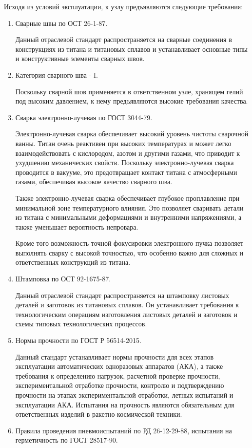 Исходя из условий эксплуатации, к узлу предъявляются следующие требования:
\begin{enumerate}
    \item Сварные швы по ОСТ 26-1-87.
    
    Данный отраслевой стандарт распространяется на сварные соединения в конструкциях из титана и титановых сплавов и устанавливает основные типы и конструктивные элементы сварных швов.
    \item Категория сварного шва - I.
    
    Поскольку сварной шов применяется в ответственном узле, хранящем гелий под высоким давлением, к нему предъявляются высокие требования качества.
    \item Сварка электронно-лучевая по ГОСТ 3044-79.
    
    Электронно-лучевая сварка обеспечивает высокий уровень чистоты сварочной ванны. Титан очень реактивен при высоких температурах и может легко взаимодействовать с кислородом, азотом и другими газами, что приводит к ухудшению механических свойств. Поскольку электронно-лучевая сварка проводится в вакууме, это предотвращает контакт титана с атмосферными газами, обеспечивая высокое качество сварного шва.
    
    Также электронно-лучевая сварка обеспечивает глубокое проплавление при минимальной зоне температурного влияния. Это позволяет сваривать детали из титана с минимальными деформациями и внутренними напряжениями, а также уменьшает вероятность непровара.

    Кроме того возможность точной фокусировки электронного пучка позволяет выполнять сварку с высокой точностью, что особенно важно для сложных и ответственных конструкций из титана.
    \item Штамповка по ОСТ 92-1675-87.
    
    Данный отраслевой стандарт распространяется на штамповку листовых деталей и заготовок из титановых сплавов. Он устанавливает требования к технологическим операциям изготовления листовых деталей и заготовок и схемы типовых технологических процессов.
    \item Нормы прочности по ГОСТ Р 56514-2015.
    
    Данный стандарт устанавливает нормы прочности для всех этапов эксплуатации автоматических одноразовых аппаратов (АКА), а также требования к определению нагрузок, расчетной проверке прочности, экспериментальной отработке прочности, контролю и подтверждению прочности на этапах экспериментальной отработки, летных испытаний и эксплуатации АКА. Испытания на прочность являются обязательным для ответственных изделий в ракетно-космической техники.
    \item Правила проведения пневмоиспытаний по РД 26-12-29-88, испытания на герметичность по ГОСТ 28517-90.
    

\end{enumerate}
